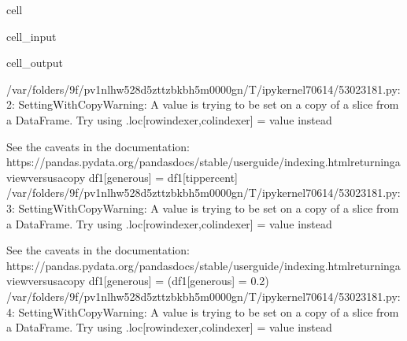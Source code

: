 \documentclass[letterpaper,10pt,english]{sphinxmanual}
\begin{document}
\begin{sphinxuseclass}{cell}
\begin{sphinxuseclass}{cell_input}
\begin{sphinxVerbatim}[commandchars=\\\{\}]
\PYG{p}{[}\PYG{p}{]}  \PYG{p}{[}\PYG{p}{]}
\PYG{p}{[}\PYG{p}{]}  \PYG{p}{[}\PYG{p}{]}  
\PYG{p}{[}\PYG{p}{]}  \PYG{p}{[}\PYG{p}{]}
\end{sphinxVerbatim}

\end{sphinxuseclass}
\begin{sphinxuseclass}{cell_output}
\begin{sphinxVerbatim}[commandchars=\\\{\}]
/var/folders/9f/pv1nlhw528d\PYGZus{}5zttzbkb\PYGZus{}h5m0000gn/T/ipykernel\PYGZus{}70614/53023181.py:2: SettingWithCopyWarning: 
A value is trying to be set on a copy of a slice from a DataFrame.
Try using .loc[row\PYGZus{}indexer,col\PYGZus{}indexer] = value instead

See the caveats in the documentation: https://pandas.pydata.org/pandas\PYGZhy{}docs/stable/user\PYGZus{}guide/indexing.html\PYGZsh{}returning\PYGZhy{}a\PYGZhy{}view\PYGZhy{}versus\PYGZhy{}a\PYGZhy{}copy
  df1[\PYGZsq{}generous\PYGZsq{}] = df1[\PYGZsq{}tip\PYGZus{}percent\PYGZsq{}]
/var/folders/9f/pv1nlhw528d\PYGZus{}5zttzbkb\PYGZus{}h5m0000gn/T/ipykernel\PYGZus{}70614/53023181.py:3: SettingWithCopyWarning: 
A value is trying to be set on a copy of a slice from a DataFrame.
Try using .loc[row\PYGZus{}indexer,col\PYGZus{}indexer] = value instead

See the caveats in the documentation: https://pandas.pydata.org/pandas\PYGZhy{}docs/stable/user\PYGZus{}guide/indexing.html\PYGZsh{}returning\PYGZhy{}a\PYGZhy{}view\PYGZhy{}versus\PYGZhy{}a\PYGZhy{}copy
  df1[\PYGZsq{}generous\PYGZsq{}] = (df1[\PYGZsq{}generous\PYGZsq{}] \PYGZgt{}= 0.2)
/var/folders/9f/pv1nlhw528d\PYGZus{}5zttzbkb\PYGZus{}h5m0000gn/T/ipykernel\PYGZus{}70614/53023181.py:4: SettingWithCopyWarning: 
A value is trying to be set on a copy of a slice from a DataFrame.
Try using .loc[row\PYGZus{}indexer,col\PYGZus{}indexer] = value instead


\end{sphinxVerbatim}
\end{sphinxuseclass}
\end{sphinxuseclass}
\end{document}
